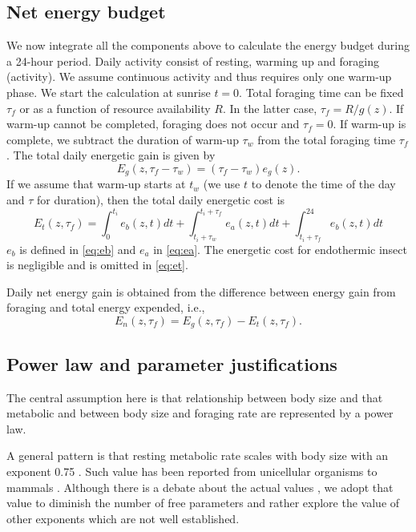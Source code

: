  \subsection*{Net energy budget}
We now integrate all the components above to calculate  the energy budget during a 24-hour period.
Daily activity consist of resting, warming up and foraging (activity).
We assume continuous activity and thus requires only one warm-up phase.
We start the calculation at sunrise $t = 0$.
Total foraging time can be fixed $\tau_f$ or as a function of resource availability $R$. 
In the latter case, $\tau_f = R/g(z)$.
If warm-up cannot be completed, foraging does not occur and $\tau_f = 0$.
If warm-up is complete, we subtract the duration of warm-up $\tau_w$ from the total foraging time $\tau_f$. 
The total daily energetic gain is given by
\[
	E_g(z,\tau_f - \tau_w) = (\tau_f - \tau_w) e_g(z).
\]
%
If we assume that warm-up starts at $t_w$ (we use $t$ to denote the time of the day and $\tau$ for duration), then the total daily  energetic cost is
\begin{equation} \label{eq:et}
	E_t(z, \tau_f) = \int_0^{t_i} e_b(z, t) dt + \int_{t_i + \tau_w}^{t_i + \tau_f } e_a(z,t) dt + \int_{t_i+\tau_f}^{24} e_b(z, t) dt 
\end{equation}
$e_b$ is defined in \cref{eq:eb}  and $e_a$ in \cref{eq:ea}.
The energetic cost for endothermic insect is negligible \citep{Heinrich1975} and is omitted in \cref{eq:et}.

Daily net energy gain is obtained from the  difference between energy gain from foraging and total energy expended, i.e.,
\[ 
	E_n(z, \tau_f) = E_g(z,\tau_f) - E_t(z, \tau_f).
\]

\subsection*{Power law and parameter justifications}
The central assumption here is that relationship between body size and that metabolic and between body size and foraging rate are represented by a power law.

A general pattern is that resting metabolic rate scales with body size with an exponent 0.75 \citep{Kleiber1947, Peters1986, Brown2004}.
Such value has been reported from unicellular organisms to mammals \citep{Brown2004}.
Although there is a debate about the actual values \citep[e.g.,][]{Isaac2010}, we adopt that value to diminish the number of free parameters and rather explore the value of other exponents which are not well established.

